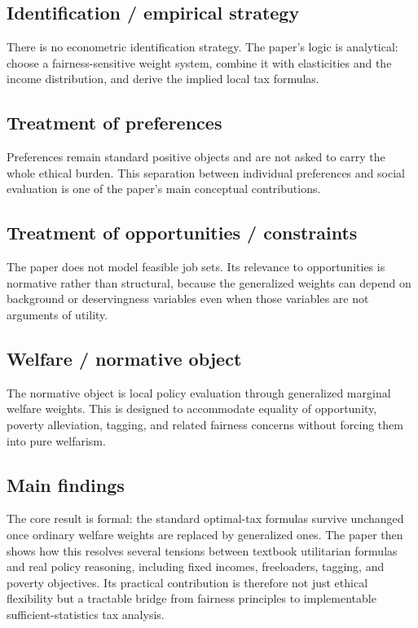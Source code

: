 \documentclass[11pt,a4paper]{article}
\begin{document}
\subsection*{Identification / empirical strategy}
There is no econometric identification strategy. The paper’s logic is analytical: choose a fairness-sensitive weight system, combine it with elasticities and the income distribution, and derive the implied local tax formulas.

\subsection*{Treatment of preferences}
Preferences remain standard positive objects and are not asked to carry the whole ethical burden. This separation between individual preferences and social evaluation is one of the paper’s main conceptual contributions.

\subsection*{Treatment of opportunities / constraints}
The paper does not model feasible job sets. Its relevance to opportunities is normative rather than structural, because the generalized weights can depend on background or deservingness variables even when those variables are not arguments of utility.

\subsection*{Welfare / normative object}
The normative object is local policy evaluation through generalized marginal welfare weights. This is designed to accommodate equality of opportunity, poverty alleviation, tagging, and related fairness concerns without forcing them into pure welfarism.

\subsection*{Main findings}
The core result is formal: the standard optimal-tax formulas survive unchanged once ordinary welfare weights are replaced by generalized ones. The paper then shows how this resolves several tensions between textbook utilitarian formulas and real policy reasoning, including fixed incomes, freeloaders, tagging, and poverty objectives. Its practical contribution is therefore not just ethical flexibility but a tractable bridge from fairness principles to implementable sufficient-statistics tax analysis.
\end{document}
